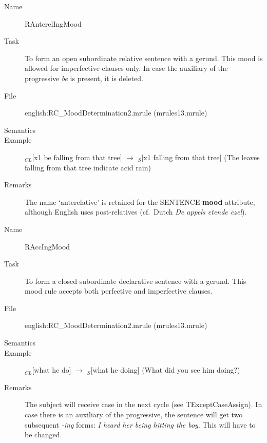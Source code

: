 \begin{description}
\vspace{1 cm}
\begin{description}
\item[Name] RAnterelIngMood
\item[Task] To form an open subordinate relative sentence with a gerund.
This mood is allowed for imperfective clauses only. 
In case the auxiliary of 
the progressive {\em be\/} is present, it is deleted.
\item[File] english:RC\_MoodDetermination2.mrule (mrules13.mrule)
\item[Semantics]
\item[Example] $_{CL}$[x1 be falling from that tree] $\rightarrow$ 
$_S$[x1 falling from that tree] (The leaves falling from that tree 
indicate acid rain)
\item[Remarks] The name `anterelative' is retained for the SENTENCE {\bf mood} 
attribute, although English uses 
post-relatives (cf.\ Dutch {\em De appels etende ezel\/}).
\end{description}

\vspace{1 cm}
\begin{description}
\item[Name] RAccIngMood
\item[Task] To form a closed subordinate declarative sentence with a gerund.
This mood rule accepts both perfective and imperfective clauses.
\item[File] english:RC\_MoodDetermination2.mrule (mrules13.mrule)
\item[Semantics]
\item[Example] $_{CL}$[what he do] $\rightarrow$ $_S$[what he doing] (What did 
you see him doing?)
\item[Remarks] The subject will receive case in the next cycle (see 
TExceptCaseAssign). In case there is an auxiliary of the progressive, the 
sentence will get two subsequent {\em -ing\/} forms: {\em I heard her being 
hitting the boy\/}. This will have to be changed.
\end{description}


\end{description}
